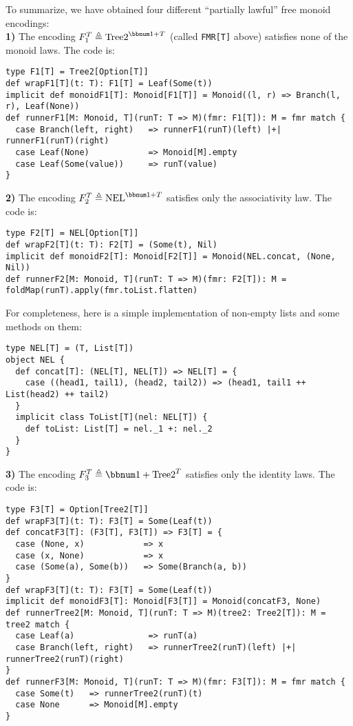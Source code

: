 To summarize, we have obtained four different \textsf{``}partially lawful\textsf{''}
free monoid encodings:\\
\textbf{1)} The encoding $F_{1}^{T}\triangleq\text{Tree2}^{\bbnum 1+T}$
(called \lstinline!FMR[T]!
above) satisfies none of the monoid laws. The code is:
\begin{lstlisting}
type F1[T] = Tree2[Option[T]]
def wrapF1[T](t: T): F1[T] = Leaf(Some(t))
implicit def monoidF1[T]: Monoid[F1[T]] = Monoid((l, r) => Branch(l, r), Leaf(None))
def runnerF1[M: Monoid, T](runT: T => M)(fmr: F1[T]): M = fmr match {
  case Branch(left, right)   => runnerF1(runT)(left) |+| runnerF1(runT)(right)
  case Leaf(None)            => Monoid[M].empty
  case Leaf(Some(value))     => runT(value)
}
\end{lstlisting}
\textbf{2)} The encoding $F_{2}^{T}\triangleq\text{NEL}^{\bbnum 1+T}$
satisfies only the associativity law. The code is:
\begin{lstlisting}
type F2[T] = NEL[Option[T]]
def wrapF2[T](t: T): F2[T] = (Some(t), Nil)
implicit def monoidF2[T]: Monoid[F2[T]] = Monoid(NEL.concat, (None, Nil))
def runnerF2[M: Monoid, T](runT: T => M)(fmr: F2[T]): M = foldMap(runT).apply(fmr.toList.flatten) 
\end{lstlisting}
For completeness, here is a simple implementation of non-empty lists
and some methods on them:
\begin{lstlisting}
type NEL[T] = (T, List[T])
object NEL {
  def concat[T]: (NEL[T], NEL[T]) => NEL[T] = {
    case ((head1, tail1), (head2, tail2)) => (head1, tail1 ++ List(head2) ++ tail2)
  }
  implicit class ToList[T](nel: NEL[T]) {
    def toList: List[T] = nel._1 +: nel._2
  }
}
\end{lstlisting}
\textbf{3)} The encoding $F_{3}^{T}\triangleq\bbnum 1+\text{Tree2}^{T}$
satisfies only the identity laws. The code is:
\begin{lstlisting}
type F3[T] = Option[Tree2[T]]
def wrapF3[T](t: T): F3[T] = Some(Leaf(t))
def concatF3[T]: (F3[T], F3[T]) => F3[T] = {
  case (None, x)            => x
  case (x, None)            => x
  case (Some(a), Some(b))   => Some(Branch(a, b))
}
def wrapF3[T](t: T): F3[T] = Some(Leaf(t))
implicit def monoidF3[T]: Monoid[F3[T]] = Monoid(concatF3, None)
def runnerTree2[M: Monoid, T](runT: T => M)(tree2: Tree2[T]): M = tree2 match {
  case Leaf(a)               => runT(a)
  case Branch(left, right)   => runnerTree2(runT)(left) |+| runnerTree2(runT)(right)
}
def runnerF3[M: Monoid, T](runT: T => M)(fmr: F3[T]): M = fmr match {
  case Some(t)   => runnerTree2(runT)(t)
  case None      => Monoid[M].empty
}
\end{lstlisting}
